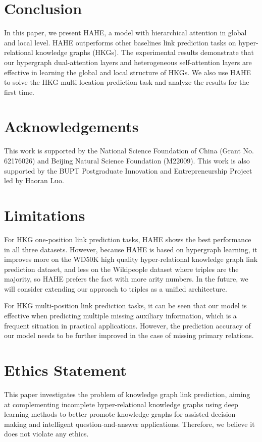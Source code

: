 \documentclass[11pt]{article}
\begin{document}
\section{Conclusion}
In this paper, we present HAHE, a model with hierarchical attention in global and local level. HAHE outperforms other baselines link prediction tasks on hyper-relational knowledge graphs (HKGs). The experimental results demonstrate that our hypergraph dual-attention layers and heterogeneous self-attention layers are effective in learning the global and local structure of HKGs. We also use HAHE to solve the HKG multi-location prediction task and analyze the results for the first time.

\section*{Acknowledgements}
This work is supported by the National Science Foundation of China (Grant No. 62176026) and Beijing Natural Science Foundation (M22009). This work is also supported by the BUPT Postgraduate Innovation and Entrepreneurship Project led by Haoran Luo.

\section*{Limitations}
For HKG one-position link prediction tasks, HAHE shows the best performance in all three datasets. However, because HAHE is based on hypergraph learning, it improves more on the WD50K high quality hyper-relational knowledge graph link prediction dataset, and less on the Wikipeople dataset where triples are the majority, so HAHE prefers the fact with more arity numbers. In the future, we will consider extending our approach to triples as a unified architecture.

For HKG multi-position link prediction tasks, it can be seen that our model is effective when predicting multiple missing auxiliary information, which is a frequent situation in practical applications. However, the prediction accuracy of our model needs to be further improved in the case of missing primary relations.

\section*{Ethics Statement}
This paper investigates the problem of knowledge graph link prediction, aiming at complementing incomplete hyper-relational knowledge graphs using deep learning methods to better promote knowledge graphs for assisted decision-making and intelligent question-and-answer applications. Therefore, we believe it does not violate any ethics.
\end{document}
